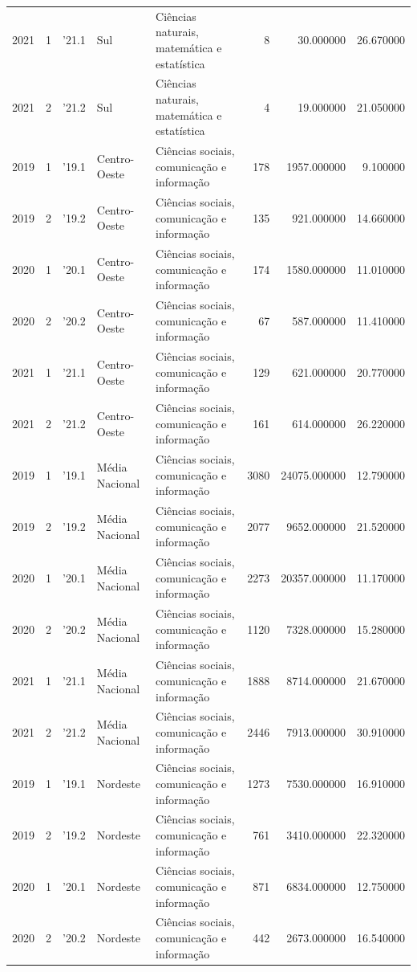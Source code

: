\begin{longtable}{rrlllrrr}
2021 & 1 & '21.1 & Sul & Ciências naturais, matemática e estatística & 8 & 30.000000 & 26.670000 \\
2021 & 2 & '21.2 & Sul & Ciências naturais, matemática e estatística & 4 & 19.000000 & 21.050000 \\
2019 & 1 & '19.1 & Centro-Oeste & Ciências sociais, comunicação e informação & 178 & 1957.000000 & 9.100000 \\
2019 & 2 & '19.2 & Centro-Oeste & Ciências sociais, comunicação e informação & 135 & 921.000000 & 14.660000 \\
2020 & 1 & '20.1 & Centro-Oeste & Ciências sociais, comunicação e informação & 174 & 1580.000000 & 11.010000 \\
2020 & 2 & '20.2 & Centro-Oeste & Ciências sociais, comunicação e informação & 67 & 587.000000 & 11.410000 \\
2021 & 1 & '21.1 & Centro-Oeste & Ciências sociais, comunicação e informação & 129 & 621.000000 & 20.770000 \\
2021 & 2 & '21.2 & Centro-Oeste & Ciências sociais, comunicação e informação & 161 & 614.000000 & 26.220000 \\
2019 & 1 & '19.1 & Média Nacional & Ciências sociais, comunicação e informação & 3080 & 24075.000000 & 12.790000 \\
2019 & 2 & '19.2 & Média Nacional & Ciências sociais, comunicação e informação & 2077 & 9652.000000 & 21.520000 \\
2020 & 1 & '20.1 & Média Nacional & Ciências sociais, comunicação e informação & 2273 & 20357.000000 & 11.170000 \\
2020 & 2 & '20.2 & Média Nacional & Ciências sociais, comunicação e informação & 1120 & 7328.000000 & 15.280000 \\
2021 & 1 & '21.1 & Média Nacional & Ciências sociais, comunicação e informação & 1888 & 8714.000000 & 21.670000 \\
2021 & 2 & '21.2 & Média Nacional & Ciências sociais, comunicação e informação & 2446 & 7913.000000 & 30.910000 \\
2019 & 1 & '19.1 & Nordeste & Ciências sociais, comunicação e informação & 1273 & 7530.000000 & 16.910000 \\
2019 & 2 & '19.2 & Nordeste & Ciências sociais, comunicação e informação & 761 & 3410.000000 & 22.320000 \\
2020 & 1 & '20.1 & Nordeste & Ciências sociais, comunicação e informação & 871 & 6834.000000 & 12.750000 \\
2020 & 2 & '20.2 & Nordeste & Ciências sociais, comunicação e informação & 442 & 2673.000000 & 16.540000 \\

\end{longtable}
